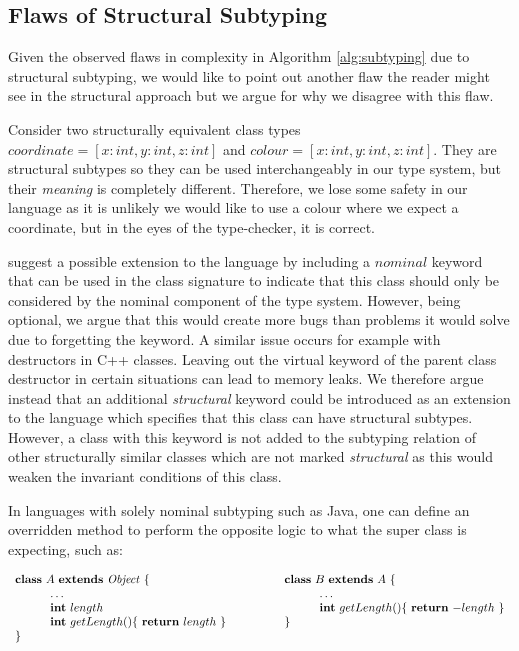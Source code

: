 \documentclass{l4proj}
\begin{document}
\subsection{Flaws of Structural Subtyping}
\label{sec:flaws}

Given the observed flaws in complexity in Algorithm \ref{alg:subtyping} due to structural subtyping, we would like to point out another flaw the reader might see in the structural approach but we argue for why we disagree with this flaw.

Consider two structurally equivalent class types $coordinate = [x:int, y:int, z:int]$ and $colour = [x:int, y:int, z:int]$.
They are structural subtypes so they can be used interchangeably in our type system, but their \emph{meaning} is completely different.
Therefore, we lose some safety in our language as it is unlikely we would like to use a colour where we expect a coordinate, but in the eyes of the type-checker, it is correct.

\citet{Dardha2017} suggest a possible extension to the language by including a $nominal$ keyword that can be used in the class signature to indicate that this class should only be considered by the nominal component of the type system.
However, being optional, we argue that this would create more bugs than problems it would solve due to forgetting the keyword.
A similar issue occurs for example with destructors in C++ classes. Leaving out the virtual keyword of the parent class destructor in certain situations can lead to memory leaks.
We therefore argue instead that an additional \emph{structural} keyword could be introduced as an extension to the language which specifies that this class can have structural subtypes.
However, a class with this keyword is not added to the subtyping relation of other structurally similar classes which are not marked \emph{structural} as this would weaken the invariant conditions of this class.

In languages with solely nominal subtyping such as Java, one can define an overridden method to perform the opposite logic to what the super class is expecting, such as:

\begin{equation}
    \begin{array}{ll}
        \syndecl{A}{\mathit{Object}} {
         &
            \qquad
            \syndecl{B}{A} {
                \\
                \qquad\quad \ldots \qquad
         &
                \qquad\qquad\quad \ldots
                \\
                \qquad\quad \textbf{int}\ length\qquad
         &
                \qquad\qquad\quad \textbf{int}\ getLength()\{\ \synret{-length}\ \}
                \\
                \qquad\quad \textbf{int}\ getLength()\{\ \synret{length}\ \}\qquad
         &
                \qquad}
            \\   }
    \end{array}
\end{equation}
\end{document}
